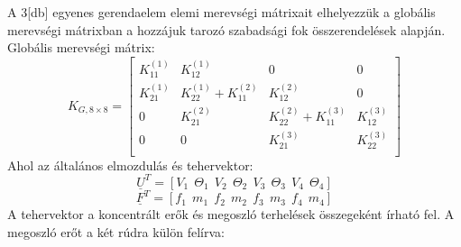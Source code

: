 \documentclass{article}
\begin{document}
		A 3[db] egyenes gerendaelem elemi merevségi mátrixait elhelyezzük a globális merevségi mátrixban a hozzájuk tarozó szabadsági fok összerendelések alapján.\\[10pt]
		Globális merevségi mátrix:
		\begin{equation}
		K_{G,8\times8}=
		\begin{bmatrix}
		K_{11}^{(1)} & K_{12}^{(1)}              & 0            			    & 0            \\
		K_{21}^{(1)} & K_{22}^{(1)}+K_{11}^{(2)} & K_{12}^{(2)}  			    & 0            \\
		0            & K_{21}^{(2)}              & K_{22}^{(2)} + K_{11}^{(3)}  & K_{12}^{(3)} \\
		0            & 0						 & K_{21}^{(3)} 					& K_{22}^{(3)} \\
		\end{bmatrix}
		\end{equation}
		Ahol az általános elmozdulás és tehervektor:
		\begin{equation}
			{\underline{U}}^T=[V_1\ \ \Theta_1\ \ V_2\ \ \Theta_2\ \ V_3\ \ \Theta_3\ \ V_4\ \ \Theta_4]
		\end{equation}
		\begin{equation}
			{\underline{F}}^T=[f_1\ \ m_1\ \ f_2\ \ m_2\ \ f_3\ \ m_3\ \ f_4\ \ m_4] 
		\end{equation}
		A tehervektor a koncentrált erők és megoszló terhelések összegeként írható fel. A megoszló erőt a két rúdra külön felírva:
		\def\arraystretch{2}
\end{document}
